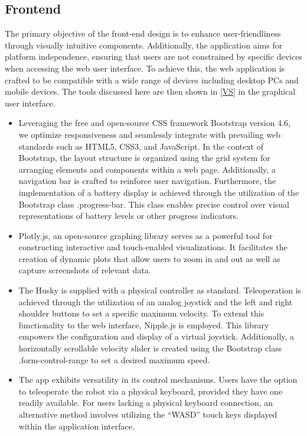 \documentclass[conference]{IEEEtran}
\begin{document}
\subsection{Frontend}
The primary objective of the front-end design is to enhance user-friendliness through visually intuitive components. Additionally, the application aims for platform independence, ensuring that users are not constrained by specific devices when accessing the web user interface. 
To achieve this, the web application is crafted to be compatible with a wide range of devices including desktop PCs and mobile devices. The tools discussed here are then shown in \ref{VS} in the graphical user interface.
\begin{itemize}
\item Leveraging the free and open-source CSS framework Bootstrap version 4.6, we optimize responsiveness and seamlessly integrate with prevailing web standards such as HTML5, CSS3, and JavaScript. 
In the context of Bootstrap, the layout structure is organized using the grid system for arranging elements and components within a web page. 
Additionally, a navigation bar is crafted to reinforce user navigation.
Furthermore, the implementation of a battery display is achieved through the utilization of the Bootstrap class .progress-bar. 
This class enables precise control over visual representations of battery levels or other progress indicators.
\item Plotly.js, an open-source graphing library serves as a powerful tool for constructing interactive and touch-enabled visualizations. It facilitates the creation of dynamic plots that allow users to zoom in and out as well as capture screenshots of relevant data.
\item The Husky is supplied with a physical controller as standard. Teleoperation is achieved through the utilization of an analog joystick and the left and right shoulder buttons to set a specific maximum velocity.
To extend this functionality to the web interface, Nipple.js is employed. This library empowers the configuration and display of a virtual joystick. Additionally, a horizontally scrollable velocity slider is created using the Bootstrap class .form-control-range to set a desired maximum speed.
\item The app exhibits versatility in its control mechanisms. Users have the option to teleoperate the robot via a physical keyboard, provided they have one readily available. For users lacking a physical keyboard connection, an alternative method involves utilizing the “WASD” touch keys displayed within the application interface. 

\end{itemize}
\end{document}
